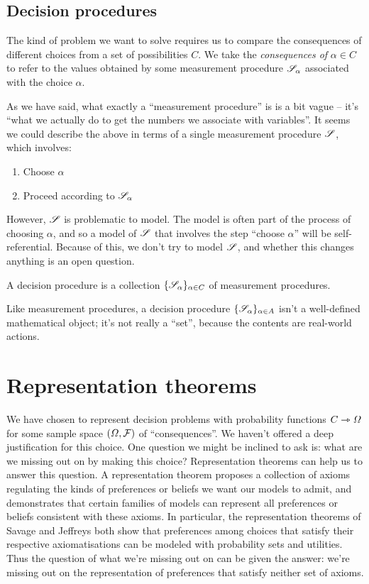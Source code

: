 \subsection{Decision procedures}\label{sec:actions}

The kind of problem we want to solve requires us to compare the consequences of different choices from a set of possibilities $C$. We take the \emph{consequences of} $\alpha\in C$ to refer to the values obtained by some measurement procedure $\mathscr{S}_\alpha$ associated with the choice $\alpha$.

As we have said, what exactly a ``measurement procedure'' is is a bit vague -- it's ``what we actually do to get the numbers we associate with variables''. It seems we could describe the above in terms of a single measurement procedure $\mathscr{S}$, which involves:

\begin{enumerate}
    \item Choose $\alpha$
    \item Proceed according to $\mathscr{S}_\alpha$
\end{enumerate}

However, $\mathscr{S}$ is problematic to model. The model is often part of the process of choosing $\alpha$, and so a model of $\mathscr{S}$ that involves the step ``choose $\alpha$'' will be self-referential. Because of this, we don't try to model $\mathscr{S}$, and whether this changes anything is an open question.

\begin{definition}
A decision procedure is a collection $\{\mathscr{S}_\alpha\}_{\alpha\in C}$ of measurement procedures.
\end{definition}

Like measurement procedures, a decision procedure $\{\mathscr{S}_\alpha\}_{\alpha\in A}$ isn't a well-defined mathematical object; it's not really a ``set'', because the contents are real-world actions.

\section{Representation theorems}\label{sec:how_represent_conseqeunces}

We have chosen to represent decision problems with probability functions $C\rightarrowtriangle \Omega$ for some sample space $(\Omega,\mathcal{F})$ of ``consequences''. We haven't offered a deep justification for this choice. One question we might be inclined to ask is: what are we missing out on by making this choice? Representation theorems can help us to answer this question. A representation theorem proposes a collection of axioms regulating the kinds of preferences or beliefs we want our models to admit, and demonstrates that certain families of models can represent all preferences or beliefs consistent with these axioms. In particular, the representation theorems of Savage and Jeffreys both show that preferences among choices that satisfy their respective axiomatisations can be modeled with probability sets and utilities. Thus the question of what we're missing out on can be given the answer: we're missing out on the representation of preferences that satisfy neither set of axioms.

